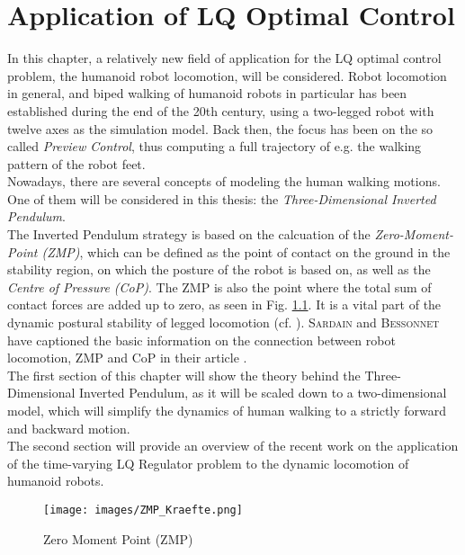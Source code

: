 \documentclass[paper=a4, pagesize, DIV=calc, BCOR=12.5mm, twoside=on, onecolumn=on, open = any, titlepage =on, parskip =half-, headsepline = on, footsepline = on, chapterprefix = on, appendixprefix = off, fontsize = 12pt, numbers = noenddot, abstract = on]{scrbook}
\numberwithin{equation}{chapter}
\theoremstyle{definition}
\theoremstyle{plain}
\theoremstyle{plain}
\theoremstyle{remark}
\theoremstyle{plain}
\theoremstyle{plain}
\begin{document}
\chapter{Application of LQ Optimal Control}
In this chapter, a relatively new field of application for the LQ optimal control problem, the humanoid robot locomotion, will be considered.  
Robot locomotion in general, and biped walking of humanoid robots in particular has been established during the end of the 20th century, using a two-legged robot with twelve axes as the simulation model. Back then, the focus has been on the so called \emph{Preview Control}, thus computing a full trajectory of e.g. the walking pattern of the robot feet.\\
Nowadays, there are several concepts of modeling the human walking motions. One of them will be considered in this thesis: the \emph{Three-Dimensional Inverted Pendulum}.\\
The Inverted Pendulum strategy is based on the calcuation of the \emph{Zero-Moment-Point (ZMP)}, which can be defined as the point of contact on the ground in the stability region, on which the posture of the robot is based on, as well as the \emph{Centre of Pressure (CoP)}. The ZMP is also the point where the total sum of contact forces are added up to zero, as seen in Fig. \ref{ZMPK}. It is a vital part of the dynamic postural stability of legged locomotion (cf. \cite{kajita:2007}). \textsc{Sardain} and \textsc{Bessonnet} have captioned the basic information on the connection between robot locomotion, ZMP and CoP in their article \cite{sardain:2004}. \\
The first section of this chapter will show the theory behind the Three-Dimensional Inverted Pendulum, as it will be scaled down to a two-dimensional model, which will simplify the dynamics of human walking to a strictly forward and backward motion.\\
The second section will provide an overview of the recent work on the application of the time-varying LQ Regulator problem to the dynamic locomotion of humanoid robots.
\begin{figure}[htbp]
\centering
	\begin{minipage}[c]{14cm}	
	\centering
	\texttt{[image: images/ZMP\_Kraefte.png]} 
	\caption{Zero Moment Point (ZMP) \cite[p.54]{kajita:2007}}
	\label{ZMPK}
	\end{minipage}
\end{figure}
\end{document}
